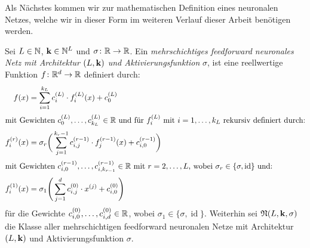 Als Nächstes kommen wir zur mathematischen Definition eines neuronalen Netzes, welche wir in dieser Form im weiteren Verlauf dieser Arbeit benötigen werden.
\begin{defn}
\label{def:nn}
Sei $L \in \mathbb{N}$, $\mathbf{k} \in \mathbb{N}^L$ und $\sigma\colon \mathbb{R} \to \mathbb{R}$. Ein \emph{mehrschichtiges feedforward neuronales Netz mit Architektur $(L, \mathbf{k})$ und Aktivierungsfunktion} $\sigma$, ist eine reellwertige Funktion $f\colon \mathbb{R}^d \to \mathbb{R}$ definiert durch:
\begin{align*}
f(x) & = \sum_{i = 1}^{k_L} c_i^{(L)} \cdot f_i^{(L)}(x) + c_0^{(L)} \nonumber \\
\intertext{mit Gewichten $c_0^{(L)},\dots,c_{k_L}^{(L)} \in \mathbb{R}$ und für $f_i^{(L)}$ mit $i = 1,\dots,k_L$ rekursiv definiert durch:} 
f_i^{(r)}(x) & = \sigma_r\bigg(\sum_{j = 1}^{k_r - 1} c_{i,j}^{(r - 1)} \cdot f_j^{(r - 1)}(x) + c_{i,0}^{(r - 1)} \bigg)\\
\intertext{mit Gewichten $c_{i,0}^{(r - 1)},\dots,c_{i,k_{r - 1}}^{(r - 1)} \in \mathbb{R}$ mit $r = 2,\dots, L$, wobei $\sigma_r \in \{\sigma, \operatorname{id}\}$ und:}
f_i^{(1)}(x) & = \sigma_1 \Bigg(\sum_{j = 1}^{d} c_{i,j}^{(0)} \cdot x^{(j)} + c_{i,0}^{(0)} \Bigg) \nonumber
\end{align*} 
für die Gewichte $c_{i,0}^{(0)},\dots,c_{i,d}^{(0)} \in \mathbb{R}$, wobei $\sigma_1 \in \{\sigma, \operatorname{id}\}$.
Weiterhin sei $\mathfrak{N}(L, \mathbf{k}, \sigma)$ die Klasse aller mehrschichtigen feedforward neuronalen Netze mit Architektur $(L, \mathbf{k})$ und Aktivierungsfunktion $\sigma$.
\end{defn}
